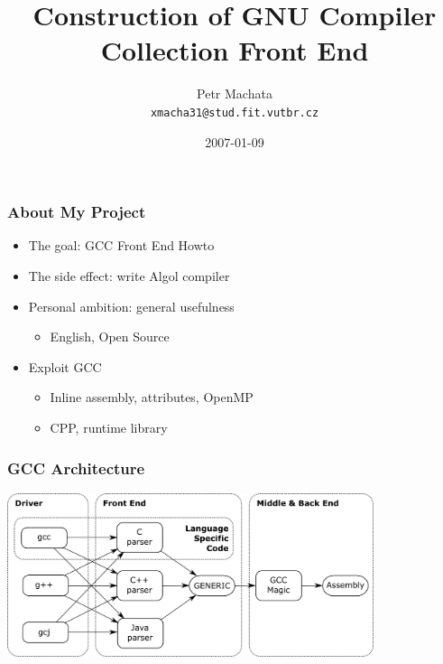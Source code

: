 \documentclass[14pt]{beamer}
\title[Construction of GNU Compiler Collection Front End]{Construction of GNU Compiler Collection Front End}
\author[Petr Machata]{Petr Machata \\ \texttt{xmacha31@stud.fit.vutbr.cz}}
\date{2007-01-09}
\def\Algol{{\sc Algol}\space}
\begin{document}
\frame{\titlepage}

\frame
{
  \frametitle{About My Project}

  \begin{itemize}
  \item The goal: GCC Front End Howto
  \item The side effect: write \Algol 60 compiler
  \item Personal ambition: general usefulness
    \begin{itemize}
    \item English, Open Source
    \end{itemize}
  \item Exploit GCC
    \begin{itemize}
    \item Inline assembly, attributes, OpenMP
    \item CPP, runtime library
    \end{itemize}
  \end{itemize}
}

\frame
{
  \frametitle{GCC Architecture}

  \includegraphics[height=4.8cm]{demo-gccarch.png}
}
\end{document}
